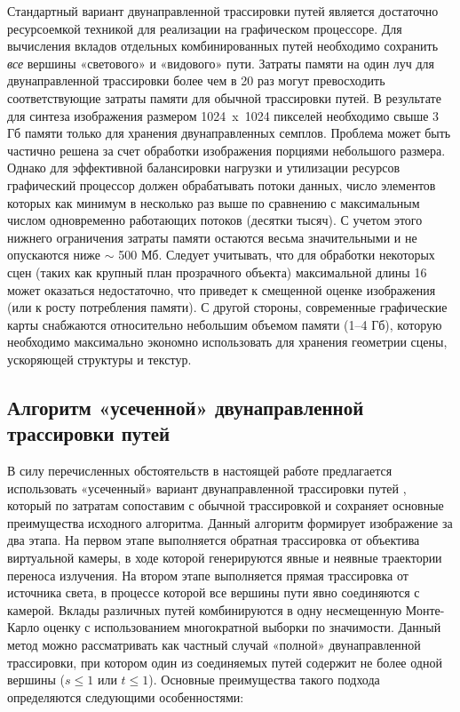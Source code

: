Стандартный вариант двунаправленной трассировки путей является достаточно ресурсоемкой техникой для реализации на графическом процессоре. Для вычисления вкладов отдельных комбинированных путей необходимо сохранить \textit{все} вершины «светового» и «видового» пути. Затраты памяти на один луч для двунаправленной трассировки более чем в 20 раз могут превосходить соответствующие затраты памяти для обычной трассировки путей. В результате для синтеза изображения размером 1024 x 1024 пикселей необходимо свыше 3 Гб памяти только для хранения двунаправленных семплов. Проблема может быть частично решена за счет обработки изображения порциями небольшого размера. Однако для эффективной балансировки нагрузки и утилизации ресурсов графический процессор должен обрабатывать потоки данных, число элементов которых как минимум в несколько раз выше по сравнению с максимальным числом одновременно работающих потоков (десятки тысяч). С учетом этого нижнего ограничения затраты памяти остаются весьма значительными и не опускаются ниже $\sim$ 500 Мб. Следует учитывать, что для обработки некоторых сцен (таких как крупный план прозрачного объекта) максимальной длины 16 может оказаться недостаточно, что приведет к смещенной оценке изображения (или к росту потребления памяти). С другой стороны, современные графические карты снабжаются относительно небольшим объемом памяти (1–4 Гб), которую необходимо максимально экономно использовать для хранения геометрии сцены, ускоряющей структуры и текстур.

\subsection{Алгоритм «усеченной» двунаправленной трассировки путей}

В силу перечисленных обстоятельств в настоящей работе предлагается использовать «усеченный» вариант двунаправленной трассировки путей \cite{bogolepov2013gpu}, который по затратам сопоставим с обычной трассировкой и сохраняет основные преимущества исходного алгоритма. Данный алгоритм формирует изображение за два этапа. На первом этапе выполняется обратная трассировка от объектива виртуальной камеры, в ходе которой генерируются явные и неявные траектории переноса излучения. На втором этапе выполняется прямая трассировка от источника света, в процессе которой все вершины пути явно соединяются с камерой. Вклады различных путей комбинируются в одну несмещенную Монте-Карло оценку с использованием многократной выборки по значимости. Данный метод можно рассматривать как частный случай «полной» двунаправленной трассировки, при котором один из соединяемых путей содержит не более одной вершины ($s \le 1$ или $t \le 1$). Основные преимущества такого подхода определяются следующими особенностями:

